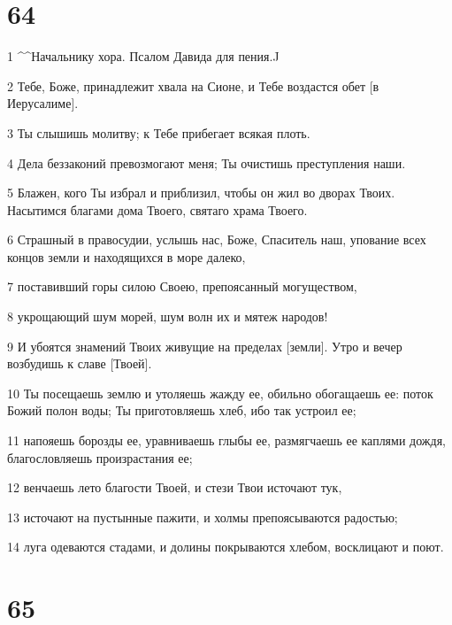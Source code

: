 \chapter{64}

\par 1 ^^Начальнику хора. Псалом Давида для пения.^^
\par 2 Тебе, Боже, принадлежит хвала на Сионе, и Тебе воздастся обет [в Иерусалиме].
\par 3 Ты слышишь молитву; к Тебе прибегает всякая плоть.
\par 4 Дела беззаконий превозмогают меня; Ты очистишь преступления наши.
\par 5 Блажен, кого Ты избрал и приблизил, чтобы он жил во дворах Твоих. Насытимся благами дома Твоего, святаго храма Твоего.
\par 6 Страшный в правосудии, услышь нас, Боже, Спаситель наш, упование всех концов земли и находящихся в море далеко,
\par 7 поставивший горы силою Своею, препоясанный могуществом,
\par 8 укрощающий шум морей, шум волн их и мятеж народов!
\par 9 И убоятся знамений Твоих живущие на пределах [земли]. Утро и вечер возбудишь к славе [Твоей].
\par 10 Ты посещаешь землю и утоляешь жажду ее, обильно обогащаешь ее: поток Божий полон воды; Ты приготовляешь хлеб, ибо так устроил ее;
\par 11 напояешь борозды ее, уравниваешь глыбы ее, размягчаешь ее каплями дождя, благословляешь произрастания ее;
\par 12 венчаешь лето благости Твоей, и стези Твои источают тук,
\par 13 источают на пустынные пажити, и холмы препоясываются радостью;
\par 14 луга одеваются стадами, и долины покрываются хлебом, восклицают и поют.

\chapter{65}

